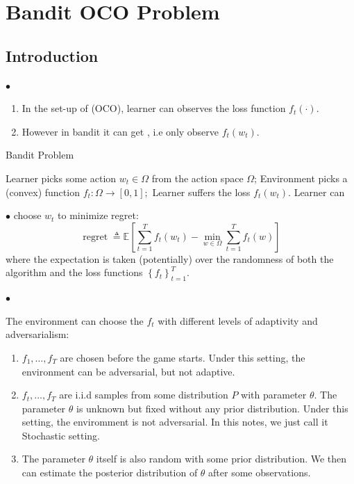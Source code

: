 \documentclass{article}
\newcommand{\re}{\operatorname{regret}}
\begin{document}
\section{Bandit OCO Problem}\label{sec:bandit}
\subsection{Introduction}
$\bullet$ 
\begin{enumerate}
    \item In the set-up of (OCO), learner can observes the  loss function $f_{t}(\cdot)$.
    \item However in bandit it can get  , i.e only observe $f_t(w_t)$. 
\end{enumerate} 
\begin{algorithm}[H]
    \caption{Bandit Problem}\label{algo:oco}
    \begin{algorithmic}[1]
                \STATE Learner picks some action $w_{t} \in \Omega$ from the action space $\Omega$; 
                \STATE Environment picks a (convex) function $f_{t}: \Omega \rightarrow[0,1] ;$
                \STATE  Learner suffers the loss $f_{t}\left(w_{t}\right)$.
                \STATE Learner can 
        \ENDFOR
    \end{algorithmic}
\end{algorithm}

$\bullet$  choose $w_{t}$ to minimize regret:
$$
\re \triangleq \mathbb{E}\left[\sum_{t=1}^{T} f_{t}\left(w_{t}\right)-\min _{w \in \Omega} \sum_{t=1}^{T} f_{t}(w)\right]
$$
where the expectation is taken (potentially) over the randomness of both the algorithm and the loss functions $\left\{f_{t}\right\}_{t=1}^{T} .$ 

$\bullet$ 

The environment can choose the $f_{t}$ with different levels of adaptivity and adversarialism:
\begin{enumerate}
    \item {} $f_{1}, \ldots, f_{T}$ are chosen before the game starts. Under this setting, the environment can be adversarial, but not adaptive.
     \item {} $f_{t}, \ldots, f_{T}$ are i.i.d samples from some distribution $P$ with parameter $\theta$. The parameter $\theta$ is unknown but fixed without any prior distribution. Under this setting, the enviromment is not adversarial. In this notes, we just call it Stochastic setting.
    \item  {} The parameter $\theta$ itself is also random with some prior distribution. We then can estimate the posterior distribution of $\theta$ after some observations.
\end{enumerate}
\end{document}
